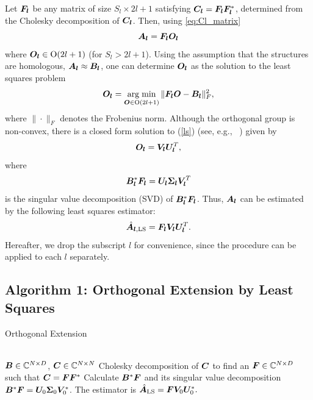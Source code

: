 Let $\boldsymbol{F}_{\boldsymbol{l}}$ be any matrix of size $S_l\times 2l+1$ satisfying $\boldsymbol{C}_{\boldsymbol{l}}= \boldsymbol{F}_{\boldsymbol{l}} \boldsymbol{F}_{\boldsymbol{l}}^*$, determined from the
Cholesky decomposition of $\boldsymbol{C}_{\boldsymbol{l}}$. Then, using \eqref{eq:Cl_matrix}
\begin{equation}
\boldsymbol{A}_{\boldsymbol{l}} = \boldsymbol{F}_{\boldsymbol{l}} \boldsymbol{O}_{\boldsymbol{l}}
\end{equation}
where $\boldsymbol{O}_{\boldsymbol{l}} \in \text{O}(2l+1)$ (for $S_l > 2l+1$). Using the assumption that 
the structures are homologous, $\boldsymbol{A}_{\boldsymbol{l}} \approx \boldsymbol{B}_{\boldsymbol{l}}$, one can determine $\boldsymbol{O}_{\boldsymbol{l}}$ as 
the solution to the
least squares problem
\begin{equation}\label{ls}
\boldsymbol{O}_{\boldsymbol{l}}=\operatorname*{arg\; min}_{\boldsymbol{O} \in \text{O}(2l+1)}  \|\boldsymbol{F}_{\boldsymbol{l}} \boldsymbol{O} - \boldsymbol{B}_{\boldsymbol{l}}\|_F^2,
\end{equation}
where $\|\cdot\|_F$ denotes the Frobenius norm. 
Although the orthogonal group is non-convex, there is a closed form solution to
(\ref{ls}) (see, e.g., ~\cite{Keller1975}) given by
\begin{equation}
\boldsymbol{O}_{\boldsymbol{l}}= \boldsymbol{V}_{\boldsymbol{l}} \boldsymbol{U}_{\boldsymbol{l}}^T,
\end{equation}
where 
\begin{equation}
\boldsymbol{B}_{\boldsymbol{l}}^* \boldsymbol{F}_{\boldsymbol{l}} = \boldsymbol{U}_{\boldsymbol{l}} \boldsymbol{\Sigma}_{\boldsymbol{l}} \boldsymbol{V}_{\boldsymbol{l}}^T
\end{equation}
is the singular value decomposition (SVD) of $\boldsymbol{B}_{\boldsymbol{l}}^* \boldsymbol{F}_{\boldsymbol{l}}$. Thus, $\boldsymbol{A}_{\boldsymbol{l}}$ can be 
estimated
by the following least squares estimator:
\begin{equation}
 \hat{\boldsymbol{A}}_{\boldsymbol{l},\text{LS}} = \boldsymbol{F}_{\boldsymbol{l}} \boldsymbol{V}_{\boldsymbol{l}} \boldsymbol{U}_{\boldsymbol{l}}^T.
\end{equation} 
Hereafter, we drop the subscript $l$ for convenience, since the procedure can be 
applied to each $l$ separately.

\subsection{Algorithm 1: Orthogonal Extension by Least Squares}
\begin{algorithm}
\caption{Orthogonal Extension}
\begin{algorithmic}[1]
\label{algo:OE}
\\
\Require $\boldsymbol{B} \in \mathbb{C}^{N \times D}$, $\boldsymbol{C} \in \mathbb{C}^{N \times N}$
\State Cholesky decomposition of $\boldsymbol{C}$ to find an  $\boldsymbol{F} \in \mathbb{C}^{N \times D}$ such that $\boldsymbol{C}=\boldsymbol{F} \boldsymbol{F}^*$
\State Calculate $\boldsymbol{B}^* \boldsymbol{F}$ and its singular value decomposition 
$\boldsymbol{B}^*\boldsymbol{F}=\boldsymbol{U}_0\boldsymbol\Sigma_0\boldsymbol{V}_0^*$.
\State The estimator is $\hat{\boldsymbol{A}}_{\text{LS}}=\boldsymbol{F}\boldsymbol{V}_0\boldsymbol{U}_0^*.$
\EndProcedure
\end{algorithmic}
\end{algorithm}


